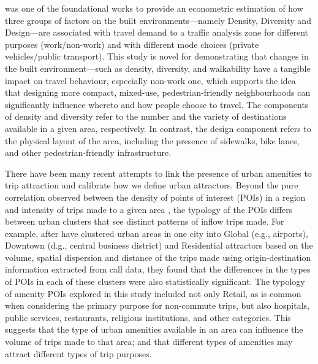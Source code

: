 \citet{cerveroTravelDemand3Ds1997} was one of the foundational works to provide an econometric estimation of how three groups of factors on the built environments---namely Density, Diversity and Design---are associated with travel demand to a traffic analysis zone for different purposes (work/non-work) and with different mode choices (private vehicles/public transport). This study is novel for demonstrating that changes in the built environment—such as density, diversity, and walkability have a tangible impact on travel behaviour, especially non-work one, which supports the idea that designing more compact, mixed-use, pedestrian-friendly neighbourhoods can significantly influence whereto and how people choose to travel. The components of density and diversity refer to the number and the variety of destinations available in a given area, respectively. In contrast, the design component refers to the physical layout of the area, including the presence of sidewalks, bike lanes, and other pedestrian-friendly infrastructure.

There have been many recent attempts to link the presence of urban amenities to trip attraction and calibrate how we define urban attractors. Beyond the pure correlation observed between the density of points of interest (POIs) in a region and intensity of trips made to a given area \citep{melikovCharacterizingUrbanMobility2021}, the typology of the POIs differs between urban clusters that see distinct patterns of inflow trips made. For example, after \citet{aaqibjavedEstimationTripAttraction2020} have clustered urban areas in one city into Global (e.g., airports), Downtown (d.g., central business district) and Residential attractors based on the volume, spatial dispersion and distance of the trips made using origin-destination information extracted from call data, they found that the differences in the types of POIs in each of these clusters were also statistically significant. The typology of amenity POIs explored in this study included not only Retail, as is common when considering the primary purpose for non-commute trips, but also hospitals, public services, restaurants, religious institutions, and other categories. This suggests that the type of urban amenities available in an area can influence the volume of trips made to that area; and that different types of amenities may attract different types of trip purposes.

